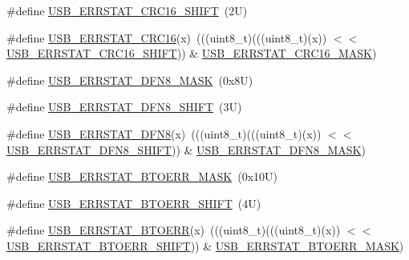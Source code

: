 \begin{DoxyCompactItemize}
\item 
\#define \mbox{\hyperlink{group___u_s_b___register___masks_gaf0bd8a085cd33bc98cf89d6ea726be46}{U\+S\+B\+\_\+\+E\+R\+R\+S\+T\+A\+T\+\_\+\+C\+R\+C16\+\_\+\+S\+H\+I\+FT}}~(2\+U)
\item 
\#define \mbox{\hyperlink{group___u_s_b___register___masks_gac7e96cf4b85807afc7c920313b5ca9b0}{U\+S\+B\+\_\+\+E\+R\+R\+S\+T\+A\+T\+\_\+\+C\+R\+C16}}(x)~(((uint8\+\_\+t)(((uint8\+\_\+t)(x)) $<$$<$ \mbox{\hyperlink{group___u_s_b___register___masks_gaf0bd8a085cd33bc98cf89d6ea726be46}{U\+S\+B\+\_\+\+E\+R\+R\+S\+T\+A\+T\+\_\+\+C\+R\+C16\+\_\+\+S\+H\+I\+FT}})) \& \mbox{\hyperlink{group___u_s_b___register___masks_gac9682448ca13abab007c9438e811610c}{U\+S\+B\+\_\+\+E\+R\+R\+S\+T\+A\+T\+\_\+\+C\+R\+C16\+\_\+\+M\+A\+SK}})
\item 
\#define \mbox{\hyperlink{group___u_s_b___register___masks_gaf2aaf7552c127da34a4252936afe561a}{U\+S\+B\+\_\+\+E\+R\+R\+S\+T\+A\+T\+\_\+\+D\+F\+N8\+\_\+\+M\+A\+SK}}~(0x8\+U)
\item 
\#define \mbox{\hyperlink{group___u_s_b___register___masks_gae26a3aed245ac0546edc65afaa2c5542}{U\+S\+B\+\_\+\+E\+R\+R\+S\+T\+A\+T\+\_\+\+D\+F\+N8\+\_\+\+S\+H\+I\+FT}}~(3\+U)
\item 
\#define \mbox{\hyperlink{group___u_s_b___register___masks_gad1d254580c4c29d95e8427b96c0d2983}{U\+S\+B\+\_\+\+E\+R\+R\+S\+T\+A\+T\+\_\+\+D\+F\+N8}}(x)~(((uint8\+\_\+t)(((uint8\+\_\+t)(x)) $<$$<$ \mbox{\hyperlink{group___u_s_b___register___masks_gae26a3aed245ac0546edc65afaa2c5542}{U\+S\+B\+\_\+\+E\+R\+R\+S\+T\+A\+T\+\_\+\+D\+F\+N8\+\_\+\+S\+H\+I\+FT}})) \& \mbox{\hyperlink{group___u_s_b___register___masks_gaf2aaf7552c127da34a4252936afe561a}{U\+S\+B\+\_\+\+E\+R\+R\+S\+T\+A\+T\+\_\+\+D\+F\+N8\+\_\+\+M\+A\+SK}})
\item 
\#define \mbox{\hyperlink{group___u_s_b___register___masks_ga64f9bd307b556ecbd454571aa2d1b4c8}{U\+S\+B\+\_\+\+E\+R\+R\+S\+T\+A\+T\+\_\+\+B\+T\+O\+E\+R\+R\+\_\+\+M\+A\+SK}}~(0x10\+U)
\item 
\#define \mbox{\hyperlink{group___u_s_b___register___masks_gaa6f963350f684e982457839f7bc842e5}{U\+S\+B\+\_\+\+E\+R\+R\+S\+T\+A\+T\+\_\+\+B\+T\+O\+E\+R\+R\+\_\+\+S\+H\+I\+FT}}~(4\+U)
\item 
\#define \mbox{\hyperlink{group___u_s_b___register___masks_ga0f32da23ed144ba6c95ef2e68c22c4f7}{U\+S\+B\+\_\+\+E\+R\+R\+S\+T\+A\+T\+\_\+\+B\+T\+O\+E\+RR}}(x)~(((uint8\+\_\+t)(((uint8\+\_\+t)(x)) $<$$<$ \mbox{\hyperlink{group___u_s_b___register___masks_gaa6f963350f684e982457839f7bc842e5}{U\+S\+B\+\_\+\+E\+R\+R\+S\+T\+A\+T\+\_\+\+B\+T\+O\+E\+R\+R\+\_\+\+S\+H\+I\+FT}})) \& \mbox{\hyperlink{group___u_s_b___register___masks_ga64f9bd307b556ecbd454571aa2d1b4c8}{U\+S\+B\+\_\+\+E\+R\+R\+S\+T\+A\+T\+\_\+\+B\+T\+O\+E\+R\+R\+\_\+\+M\+A\+SK}})
$$
\end{DoxyCompactItemize}
